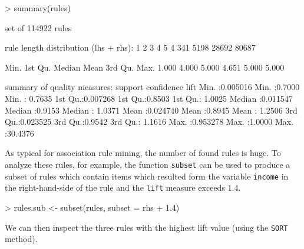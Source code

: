 \documentclass[10pt,a4paper]{article}
\newcommand{\code}[1]{\texttt{#1}}
\begin{document}
\begin{Schunk}
\begin{Sinput}
> summary(rules)
\end{Sinput}
\begin{Soutput}
set of 114922 rules

rule length distribution (lhs + rhs):
    1     2     3     4     5 
    4   341  5198 28692 80687 

   Min. 1st Qu.  Median    Mean 3rd Qu.    Max. 
  1.000   4.000   5.000   4.651   5.000   5.000 

summary of quality measures:
    support           confidence          lift        
 Min.   :0.005016   Min.   :0.7000   Min.   : 0.7635  
 1st Qu.:0.007268   1st Qu.:0.8503   1st Qu.: 1.0025  
 Median :0.011547   Median :0.9153   Median : 1.0371  
 Mean   :0.024740   Mean   :0.8945   Mean   : 1.2506  
 3rd Qu.:0.023525   3rd Qu.:0.9542   3rd Qu.: 1.1616  
 Max.   :0.953278   Max.   :1.0000   Max.   :30.4376  
\end{Soutput}
\end{Schunk}

As typical for association rule mining, the number of found rules is
huge.  To analyze these rules, for example, the function \code{subset}
can be used to produce a subset of rules which contain items which
resulted form the variable \code{income} in the right-hand-side of the
rule and the \code{lift} measure exceeds $1.4$.

\begin{Schunk}
\begin{Sinput}
> rules.sub <- subset(rules, subset = rhs %
+     1.4)
\end{Sinput}
\end{Schunk}

We can then inspect the three rules with the highest lift value (using the
\code{SORT} method).
\end{document}
